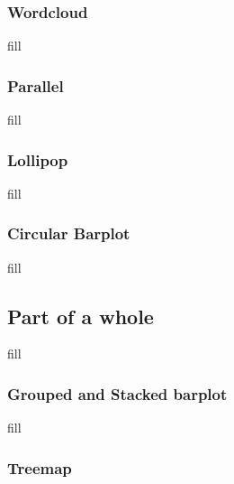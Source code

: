 \documentclass[
  b5paper]{book}
\begin{document}
\hypertarget{wordcloud}{%
\subsubsection*{Wordcloud}\label{wordcloud}}

fill

\hypertarget{parallel}{%
\subsubsection*{Parallel}\label{parallel}}

fill

\hypertarget{lollipop}{%
\subsubsection*{Lollipop}\label{lollipop}}

fill

\hypertarget{circular-barplot}{%
\subsubsection*{Circular Barplot}\label{circular-barplot}}

fill

\hypertarget{part-of-a-whole}{%
\subsection*{Part of a whole}\label{part-of-a-whole}}

fill

\hypertarget{grouped-and-stacked-barplot}{%
\subsubsection*{Grouped and Stacked barplot}\label{grouped-and-stacked-barplot}}

fill

\hypertarget{treemap}{%
\subsubsection*{Treemap}\label{treemap}}
\end{document}
